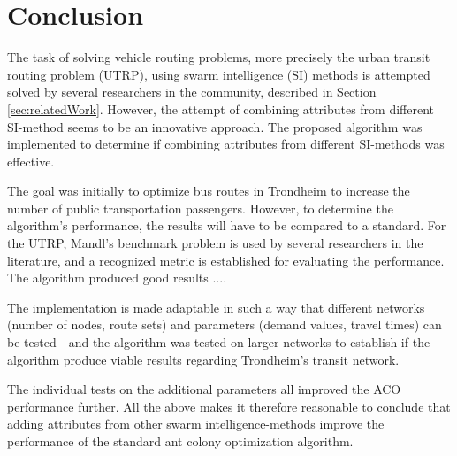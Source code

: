 \section{Conclusion}

The task of solving vehicle routing problems, more precisely the urban transit routing problem (UTRP), using swarm intelligence (SI) methods is attempted solved by several researchers in the community, described in Section \vref{sec:relatedWork}. However, the attempt of combining attributes from different SI-method seems to be an innovative approach. The proposed algorithm was implemented to determine if combining attributes from different SI-methods was effective. 

The goal was initially to optimize bus routes in Trondheim to increase the number of public transportation passengers. However, to determine the algorithm's performance, the results will have to be compared to a standard. For the UTRP, Mandl's benchmark problem is used by several researchers in the literature, and a recognized metric is established for evaluating the performance. The algorithm produced good results ....

The implementation is made adaptable in such a way that different networks (number of nodes, route sets) and parameters (demand values, travel times) can be tested - and the algorithm was tested on larger networks to establish if the algorithm produce viable results regarding Trondheim's transit network. 

The individual tests on the additional parameters all improved the ACO performance further. All the above makes it therefore reasonable to conclude that adding attributes from other swarm intelligence-methods improve the performance of the standard ant colony optimization algorithm.